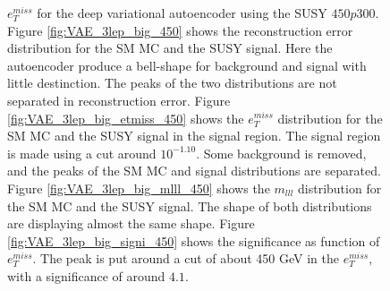 \begin{figure}[H]
{    $e_T^{miss}$ for the deep variational autoencoder using the SUSY $450p300$.
    Figure \ref{fig:VAE_3lep_big_450} shows the reconstruction error 
    distribution for the SM MC and the SUSY signal. Here the autoencoder produce a bell-shape for background and 
    signal with little destinction. The peaks of the two distributions are not separated in reconstruction error. Figure \ref{fig:VAE_3lep_big_etmiss_450} 
    shows the $e_T^{miss}$ distribution for the SM MC and the SUSY signal in the signal region. 
    The signal region is made using a cut around $10^{-1.10}$. Some background is removed, and the peaks of the SM MC and signal 
    distributions are separated. Figure \ref{fig:VAE_3lep_big_mlll_450} shows the $m_{lll}$ distribution for the SM MC and the SUSY signal. 
    The shape of both distributions are displaying almost the same shape. Figure \ref{fig:VAE_3lep_big_signi_450} shows the significance as 
    function of $e_T^{miss}$. The peak is put around a cut of about 450 GeV in the $e_T^{miss}$, with a significance of around $4.1$.}
    \label{fig:VAE_3lep_big_rec_sig_signi_450}
\end{figure}

